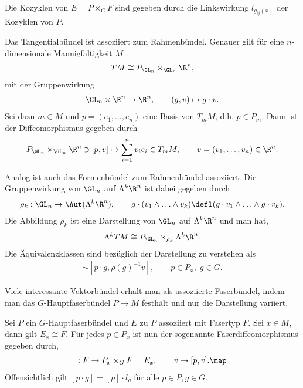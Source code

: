 \documentclass[%
	paper=a5,%
	fleqn,%
	DIV=18,%
	BCOR=0mm,
	fontsize=11pt,
	titlepage=false,%
	bibliography=totoc,
	DIV=18,%
	twoside=true,
	pdftitle=Riemannsche Geometrie,
	pdfauthor=Uwe Semmelmann,
	numbers=noendperiod]%
	{scrbook}
\begin{document}
\begin{rem}
Die Kozyklen von $E = P \times_G F$ sind gegeben durch die Linkswirkung
$l_{g_{ij}(x)}$ der Kozyklen von $P$.\map
\end{rem}

\begin{ex}
\begin{exenum}
\item 
Das Tangentialbündel ist assoziiert zum Rahmenbündel. Genauer gilt
für eine $n$-dimensionale Mannigfaltigkeit $M$
\begin{align*}
TM \cong
P_{\GL_n}\times_{\GL_n} \R^n,
\end{align*}
mit der Gruppenwirkung
\begin{align*}
\GL_n \times\R^n\to \R^n,\qquad (g,v)\mapsto g\cdot v.
\end{align*}
Sei dazu $m\in M$ und $p=(e_1,\ldots,e_n)$ eine Basis von $T_mM$, d.h. $p\in
P_m$. Dann ist der Diffeomorphismus gegeben durch
\begin{align*}
P_{\GL_n}\times_{\GL_n}\R^n \ni [p,v] \mapsto \sum_{i=1}^n v_i e_i \in
T_mM,\qquad
v = (v_1, \ldots, v_n)\in\R^n.
\end{align*}
\item 
Analog ist auch das Formenbündel zum Rahmenbündel assoziiert.
Die Gruppenwirkung von $\GL_n$ auf $\Lambda^k \R^n$ ist dabei gegeben durch
\begin{align*}
\rho_k : \GL_n\to \Aut(\Lambda^k \R^n),\qquad
g\cdot (v_1\wedge \ldots\wedge v_k)
\defl (g\cdot v_1\wedge \ldots \wedge g\cdot v_k).
\end{align*}
Die Abbildung $\rho_k$ ist eine Darstellung von $\GL_n$ auf $\Lambda^k \R^n$ und man hat,
\begin{align*}
\Lambda^k TM \cong P_{\GL_n} \times_{\rho_k} \Lambda^k \R^n.
\end{align*}
Die Äquivalenzklassen sind bezüglich der Darstellung zu verstehen als
\begin{align*}
[p,v] \sim [p\cdot g,\rho(g)^{-1}v],\qquad p\in P_x,\; g\in G.
\end{align*}
\item
Viele interessante Vektorbündel erhält man als assoziierte Faserbündel, indem
man das $G$-Hauptfaserbündel $P\to M$ festhält und nur die Darstellung
variiert.~\bsp
\end{exenum}
\end{ex}

\begin{rem}
Sei $P$ ein $G$-Hauptfaserbündel und $E$ zu $P$ assoziiert mit Fasertyp $F$. Sei
$x\in M$, dann gilt $E_x\cong F$. Für jedes $p\in P_x$ 
ist nun der sogenannte Faserdiffeomorphismus gegeben durch,
\begin{align*}
[p] : F\to P_x\times_G F = E_x,\qquad
v\mapsto [p,v].\map
\end{align*}
Offensichtlich gilt $[p \cdot g] = [p] \cdot l_g$ für alle $p\in P, g\in G$.
\end{rem}
\end{document}
